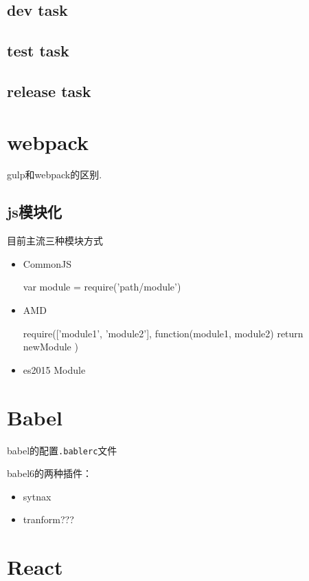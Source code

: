 \subsection{dev task}

\subsection{test task}

\subsection{release task}


\section{webpack}

gulp和webpack的区别.

\subsection{js模块化}
目前主流三种模块方式
\begin{itemize}
\item CommonJS
\begin{JavaScript}
var module = require('path/module')
\end{JavaScript}
\item AMD
\begin{JavaScript}
require(['module1', 'module2'], function(module1, module2) {
	return newModule
})
\end{JavaScript}
\item es2015 Module
\begin{JavaScript}

\end{JavaScript}
\end{itemize}

\section{Babel}


babel的配置\lstinline$.bablerc$文件

babel6的两种插件：
\begin{itemize}
\item sytnax
\item tranform???
\end{itemize}

\section{React}


